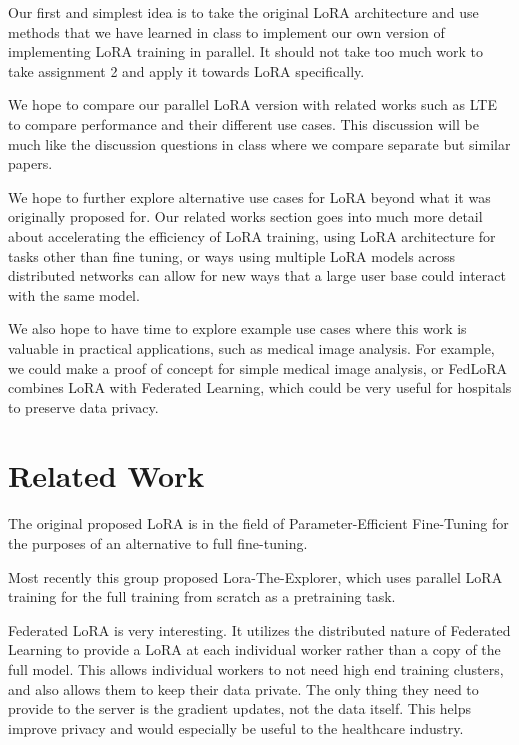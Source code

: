 \documentclass[pdftex,twocolumn,10pt,letterpaper]{article}
\begin{document}
Our first and simplest idea is to take the original LoRA architecture and use methods that we have learned in class to implement our own version of implementing LoRA training in parallel. It should not take too much work to take assignment 2 and apply it towards LoRA specifically.

We hope to compare our parallel LoRA version with related works such as LTE to compare performance and their different use cases. This discussion will be much like the discussion questions in class where we compare separate but similar papers.

We hope to further explore alternative use cases for LoRA beyond what it was originally proposed for. Our related works section goes into much more detail about accelerating the efficiency of LoRA training, using LoRA architecture for tasks other than fine tuning, or ways using multiple LoRA models across distributed networks can allow for new ways that a large user base could interact with the same model.

We also hope to have time to explore example use cases where this work is valuable in practical applications, such as medical image analysis. For example, we could make a proof of concept for simple medical image analysis, or FedLoRA combines LoRA with Federated Learning, which could be very useful for hospitals to preserve data privacy.
 
\section{Related Work}
\cite{Hu2021LoRA}
The original proposed LoRA is in the field of Parameter-Efficient Fine-Tuning for the purposes of an alternative to full fine-tuning.

\cite{huh2024training}
Most recently this group proposed Lora-The-Explorer, which uses parallel LoRA training for the full training from scratch as a pretraining task. 

\cite{yi2023fedlora}
\cite{Rieke2019FederatedLearning}
Federated LoRA is very interesting. It utilizes the distributed nature of Federated Learning to provide a LoRA at each individual worker rather than a copy of the full model. This allows individual workers to not need high end training clusters, and also allows them to keep their data private. The only thing they need to provide to the server is the gradient updates, not the data itself. This helps improve privacy and would especially be useful to the healthcare industry.
\end{document}
